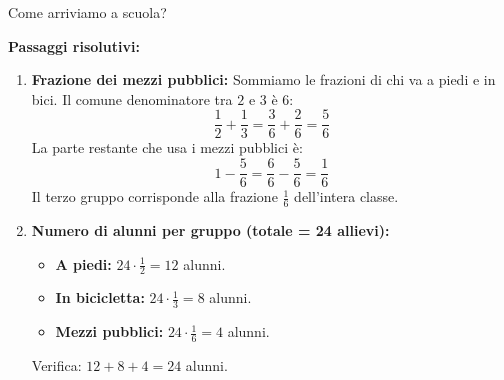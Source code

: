\begin{esercizio}{Come arriviamo a scuola?}
\begin{soluzione}
  \textbf{Passaggi risolutivi:}
  \begin{enumerate}[label=\alph*)]
    \item \textbf{Frazione dei mezzi pubblici:} Sommiamo le frazioni di chi va a piedi e in bici. Il comune denominatore tra $2$ e $3$ è $6$:
      \[
      \frac{1}{2} + \frac{1}{3} = \frac{3}{6} + \frac{2}{6} = \frac{5}{6}
      \]
      La parte restante che usa i mezzi pubblici è:
      \[
      1 - \frac{5}{6} = \frac{6}{6} - \frac{5}{6} = \frac{1}{6}
      \]
      Il terzo gruppo corrisponde alla frazione $\frac{1}{6}$ dell'intera classe.
    \item \textbf{Numero di alunni per gruppo (totale = 24 allievi):}
      \begin{itemize}
        \item \textbf{A piedi:} $24 \cdot \frac{1}{2} = 12$ alunni.
        \item \textbf{In bicicletta:} $24 \cdot \frac{1}{3} = 8$ alunni.
        \item \textbf{Mezzi pubblici:} $24 \cdot \frac{1}{6} = 4$ alunni.
      \end{itemize}
      Verifica: $12 + 8 + 4 = 24$ alunni.
  \end{enumerate}
\end{soluzione}
\end{esercizio}

\condnewpage


